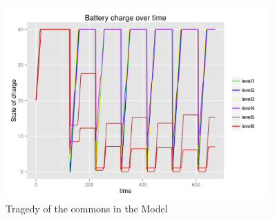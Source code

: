 \documentclass[a4paper]{article}
\begin{document}
\begin{figure}[!ht]
 \centering
 \includegraphics[width = 0.9\textwidth]{tragedy_of_commons.jpg}
 \caption{Tragedy of the commons in the Model}
 \label{software_tragedy}
\end{figure}
\end{document}
